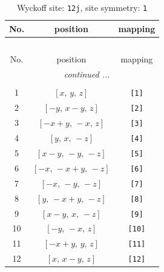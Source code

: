 \documentclass[fleqn,8pt]{jsarticle}
\begin{document}
\begin{longtable}{ccc}
\caption{Wyckoff site: {\tt 12j}, site symmetry: {\tt 1}}
 \\
 \hline \hline
No. & position & mapping \\ \hline \endfirsthead

\multicolumn{2}{l}{\tablename\ \thetable{}} \\
 \hline \hline
No. & position & mapping \\ \hline \endhead

 \hline \hline
\multicolumn{2}{r}{\footnotesize\it continued ...} \\ \endfoot

 \hline \hline
\multicolumn{2}{r}{} \\ \endlastfoot

1 & $\left[ x,\, y,\, z \right]$ & {\tt [1]} \\ \hline
2 & $\left[ - y,\, x - y,\, z \right]$ & {\tt [2]} \\ \hline
3 & $\left[ - x + y,\, - x,\, z \right]$ & {\tt [3]} \\ \hline
4 & $\left[ y,\, x,\, - z \right]$ & {\tt [4]} \\ \hline
5 & $\left[ x - y,\, - y,\, - z \right]$ & {\tt [5]} \\ \hline
6 & $\left[ - x,\, - x + y,\, - z \right]$ & {\tt [6]} \\ \hline
7 & $\left[ - x,\, - y,\, - z \right]$ & {\tt [7]} \\ \hline
8 & $\left[ y,\, - x + y,\, - z \right]$ & {\tt [8]} \\ \hline
9 & $\left[ x - y,\, x,\, - z \right]$ & {\tt [9]} \\ \hline
10 & $\left[ - y,\, - x,\, z \right]$ & {\tt [10]} \\ \hline
11 & $\left[ - x + y,\, y,\, z \right]$ & {\tt [11]} \\ \hline
12 & $\left[ x,\, x - y,\, z \right]$ & {\tt [12]} \\
\end{longtable}
\end{document}
